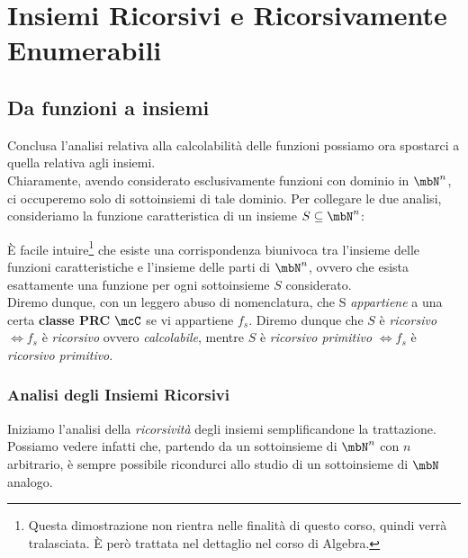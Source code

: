 \chapter{Insiemi Ricorsivi e Ricorsivamente Enumerabili}

\section{Da funzioni a insiemi}

Conclusa l'analisi relativa alla calcolabilità delle funzioni possiamo ora spostarci a quella relativa agli insiemi.\\
Chiaramente, avendo considerato esclusivamente funzioni con dominio in \(\mbN^n\), ci occuperemo solo di sottoinsiemi di tale dominio.
Per collegare le due analisi, consideriamo la funzione caratteristica di un insieme \(S\subseteq \mbN^n\):


È facile intuire\footnote{Questa dimostrazione non rientra nelle finalità di questo corso, quindi verrà tralasciata. È però trattata nel dettaglio nel corso di Algebra.} che esiste una corrispondenza biunivoca tra l'insieme delle funzioni caratteristiche e l'insieme delle parti di \(\mbN^n\), ovvero che esista esattamente una funzione per ogni sottoinsieme \(S\) considerato.\\
Diremo dunque, con un leggero abuso di nomenclatura,  che S \textit{appartiene} a una certa \textbf{classe PRC} \(\mcC\) se vi appartiene \(f_s\).
Diremo dunque che \(S\) è \textit{ricorsivo} \(\iff f_s\) è \textit{ricorsivo} ovvero \textit{calcolabile}, mentre \(S\) è \textit{ricorsivo primitivo} \(\iff f_s\) è \textit{ricorsivo primitivo}.

\subsection{Analisi degli Insiemi Ricorsivi}

Iniziamo l'analisi della \textit{ricorsività} degli insiemi semplificandone la trattazione.  Possiamo vedere infatti che, partendo da un sottoinsieme di \(\mbN^n\) con \(n\) arbitrario, è sempre possibile ricondurci allo studio di un sottoinsieme di \(\mbN\) analogo.

